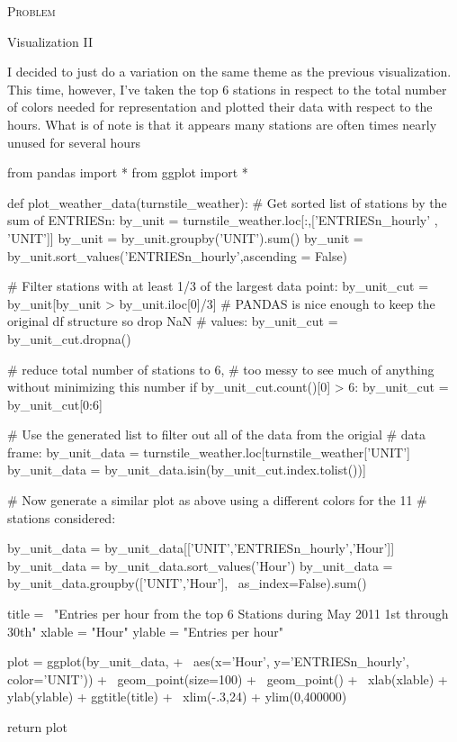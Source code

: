 \documentclass{article}
\numberwithin{questionCtr}{section}
\newcounter{problemCtr}
\newenvironment{problem}{%
   \bigskip\noindent%
   \refstepcounter{problemCtr}%
   \textsc{Problem \theproblemCtr}%
   \newline%
   }{\par\bigskip}  %
\numberwithin{problemCtr}{section}
\begin{document}
\begin{problem}
  Visualization II
\end{problem}

I decided to just do a variation on the same theme as the previous
visualization.  This time, however, I've taken the top 6 stations in respect to
the total number of colors needed for representation and plotted their data with
respect to the hours.  What is of note is that it appears many stations are
often times nearly unused for several hours

\newpage

\begin{mdframed}[linecolor=black, topline=true, bottomline=true,
  leftline=false, rightline=false]
\footnotesize
\begin{python1}
from pandas import *
from ggplot import *

def plot_weather_data(turnstile_weather):
    # Get sorted list of stations by the sum of ENTRIESn: 
    by_unit = turnstile_weather.loc[:,['ENTRIESn_hourly' , 'UNIT']]
    by_unit = by_unit.groupby('UNIT').sum()
    by_unit = by_unit.sort_values('ENTRIESn_hourly',ascending = False)

    # Filter stations with at least 1/3 of the largest data point:
    by_unit_cut = by_unit[by_unit > by_unit.iloc[0]/3]
    # PANDAS is nice enough to keep the original df structure so drop NaN
    # values:
    by_unit_cut = by_unit_cut.dropna()

    # reduce total number of stations to 6, 
    # too messy to see much of anything without minimizing this number
    if by_unit_cut.count()[0] > 6: 
        by_unit_cut = by_unit_cut[0:6]

    # Use the generated list to filter out all of the data from the origial
    # data frame:    
    by_unit_data = turnstile_weather.loc[turnstile_weather['UNIT']
    by_unit_data = by_unit_data.isin(by_unit_cut.index.tolist())]

    # Now generate a similar plot as above using a different colors for the 11 
    # stations considered:

    by_unit_data = by_unit_data[['UNIT','ENTRIESn_hourly','Hour']]
    by_unit_data = by_unit_data.sort_values('Hour')
    by_unit_data = by_unit_data.groupby(['UNIT','Hour'], \
        as_index=False).sum()
    
    title = \
    "Entries per hour from the top 6 Stations during May 2011 1st through 30th"
    xlable = "Hour"
    ylable = "Entries per hour"

    plot = ggplot(by_unit_data, + \
        aes(x='Hour', y='ENTRIESn_hourly', color='UNIT')) + \
        geom_point(size=100) + \
        geom_point() + \
        xlab(xlable) + ylab(ylable) + ggtitle(title) + \
        xlim(-.3,24) + ylim(0,400000)

    return plot
\end{python1}
\end{mdframed}
\end{document}

